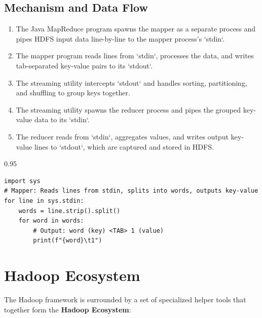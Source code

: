 \documentclass[12pt,a4paper]{article}
\begin{document}
\subsection{Mechanism and Data Flow}
\begin{enumerate}[leftmargin=*, itemsep=3pt]
  \item The Java MapReduce program spawns the mapper as a separate process and pipes HDFS input data line-by-line to the mapper process's `stdin`.
  \item The mapper program reads lines from `stdin`, processes the data, and writes tab-separated key-value pairs to its `stdout`.
  \item The streaming utility intercepts `stdout` and handles sorting, partitioning, and shuffling to group keys together.
  \item The streaming utility spawns the reducer process and pipes the grouped key-value data to its `stdin`.
  \item The reducer reads from `stdin`, aggregates values, and writes output key-value lines to `stdout`, which are captured and stored in HDFS.
\end{enumerate}

\begin{tcolorbox}[examplebox, title={Example: Python Mapper Script for Streaming}]
\begin{spacing}{0.95}
\begin{verbatim}
import sys
# Mapper: Reads lines from stdin, splits into words, outputs key-value
for line in sys.stdin:
    words = line.strip().split()
    for word in words:
        # Output: word (key) <TAB> 1 (value)
        print(f"{word}\t1")
\end{verbatim}
\end{spacing}
\end{tcolorbox}

\section{Hadoop Ecosystem}

The Hadoop framework is surrounded by a set of specialized helper tools that together form the \textbf{Hadoop Ecosystem}:
\end{document}
